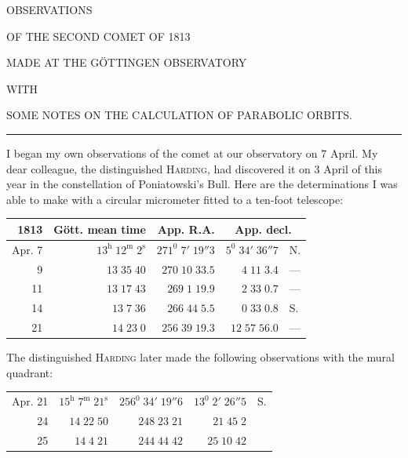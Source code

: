 \renewcommand{\Article}[1]{\par\medskip\Needspace{4\baselineskip}\pdfbookmark[1]{Art. #1}{cometae-art-#1}\centerline{\textbf{#1.}}\nobreak\smallskip}
\begin{center}
{\large OBSERVATIONS}\par\medskip
{\Large OF THE SECOND COMET OF 1813}\par\medskip
MADE AT THE GÖTTINGEN OBSERVATORY\par\medskip
WITH\par\medskip
SOME NOTES ON THE CALCULATION OF PARABOLIC ORBITS.\par\smallskip
\rule{.09\linewidth}{.3pt}
\end{center}

I began my own observations of the comet at our observatory on 7 April. My dear colleague, the distinguished \textsc{Harding}, had discovered it on 3 April of this year in the constellation of Poniatowski’s Bull. Here are the determinations I was able to make with a circular micrometer fitted to a ten-foot telescope:
\begin{center}\small\setlength{\tabcolsep}{4pt}
\begin{tabular}{r|r|r|r l}
1813&Gött. mean time&App. R.A.&\multicolumn{2}{c}{App. decl.}\\\hline
Apr. 7&$13^{\mathrm h}\;12^{\mathrm m}\;2^{\mathrm s}$&$271^0\;7'\;19''3$&$5^0\;34'\;36''7$&N.\\
9&$13\;35\;40$&$270\;10\;33.5$&$4\;11\;3.4$&—\\
11&$13\;17\;43$&$269\;1\;19.9$&$2\;33\;0.7$&—\\
14&$13\;7\;36$&$266\;44\;5.5$&$0\;33\;0.8$&S.\\
21&$14\;23\;0$&$256\;39\;19.3$&$12\;57\;56.0$&—
\end{tabular}\end{center}

The distinguished \textsc{Harding} later made the following observations with the mural quadrant:
\begin{center}\small\setlength{\tabcolsep}{4pt}
\begin{tabular}{r|r|r|r l}
Apr. 21&$15^{\mathrm h}\;7^{\mathrm m}\;21^{\mathrm s}$&$256^0\;34'\;19''6$&$13^0\;2'\;26''5$&S.\\
24&$14\;22\;50$&$248\;23\;21$&$21\;45\;2$&\\
25&$14\;4\;21$&$244\;44\;42$&$25\;10\;42$&
\end{tabular}\end{center}

